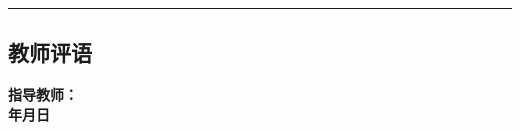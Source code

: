\documentclass[12pt,a4paper,oneside,UTF8]{ctexart}
\begin{document}
	{\noindent}	\rule[-10pt]{17.18cm}{0.05em} 

  \subsection*{\textbf{教师评语}}
  \vspace{2cm} %
  \vspace{2cm} %
  \vspace{2cm} %
  \vspace{2cm} %

  \begin{flushright}
    \textbf{指导教师：\underline{\hspace{3cm}}} \\ %
    \textbf{\underline{\hspace{1.5cm}}年\underline{\hspace{1.5cm}}月\underline{\hspace{1.5cm}}日}
  \end{flushright}
\end{document}
